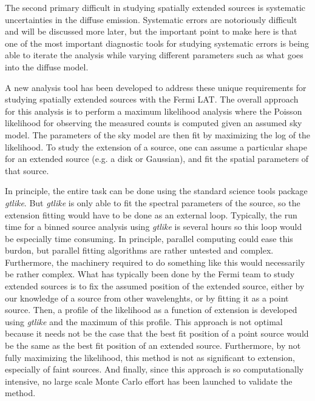\documentclass[12pt]{article}
\begin{document}
The second primary difficult in studying spatially extended sources is
systematic uncertainties in the diffuse emission. Systematic errors are
notoriously difficult and will be discussed more later, but the important
point to make here is that one of the most important diagnostic tools for
studying systematic errors is being able to iterate the analysis while
varying different parameters such as what goes into the diffuse model.

A new analysis tool has been developed to address these unique
requirements for studying spatially extended sources with the Fermi
LAT. The overall approach for this analysis is to perform a maximum
likelihood analysis where the Poisson likelihood for observing the
measured counts is computed given an assumed sky model. The parameters
of the sky model are then fit by maximizing the log of the likelihood.
To study the extension of a source, one can assume a particular shape
for an extended source (e.g. a disk or Gaussian), and fit the spatial
parameters of that source.

In principle, the entire task can be done using the standard science
tools package {\em gtlike}\cite{Science-Tools-gtlike}. But {\em gtlike} is
only able to fit the spectral parameters of the source, so the extension
fitting would have to be done as an external loop. Typically, the run time
for a binned source analysis using {\em gtlike} is several hours so this loop
would be especially time consuming. In principle, parallel computing could
ease this burdon, but parallel fitting algorithms are rather untested
and complex. Furthermore, the machinery required to do something like
this would necessarily be rather complex. What has typically been done by
the Fermi team to study extended sources is to fix the assumed position
of the extended source, either by our knowledge of a source from other
wavelenghts, or by fitting it as a point source. Then, a profile of the
likelihood as a function of extension is developed using {\em gtlike}
and the maximum of this profile. This approach is not optimal because it
needs not be the case that the best fit position of a point source would
be the same as the best fit position of an extended source. Furthermore,
by not fully maximizing the likelihood, this method is not as significant to
extension, especially of faint sources. And finally, since this approach
is so computationally intensive, no large scale Monte Carlo effort has been
launched to validate the method.
\end{document}
